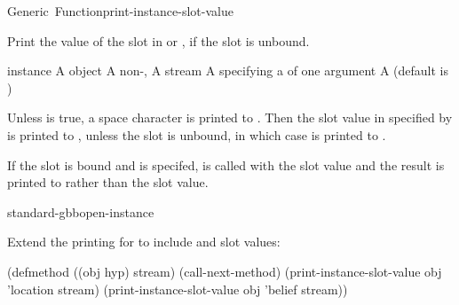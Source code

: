 \documentclass[10pt,twoside,english,pdftex]{article}
\begin{document}
\begin{functiondoc}{Generic~Function}{print-instance-slot-value}%
  {
    }

\fnsyntax

\fnpurpose Print the value of the  slot in 
or \code{[Unbound]}, if the slot is unbound.

\fnmethods
{}

\fnpackage {}

\fnmodule {}

\fnargs
\begin{args}{instance}
\arg[instance] A  object
 A non-\nil, 
\arg[stream] A stream
\arg[function] A  specifying a 
   of one argument
\arg[no-space] A  (default is \nil)
\end{args}

\fndescription
%
Unless  is true, a space character is printed to .
Then the slot value in  specified by  is
printed to , unless the slot is unbound, in which case
\code{[Unbound]} is printed to .

If the slot is bound and  is specifed,  is
called with the slot value and the result is printed to  rather
than the slot value.

\begin{alsos}{standard-gbbopen-instance}
\end{alsos}

\fnexample
%
%
Extend the  printing for 
 to include  and  slot values:
\W\supp
\begin{example}
  (defmethod  ((obj hyp) stream)
    (call-next-method)
    (print-instance-slot-value obj 'location stream)
    (print-instance-slot-value obj 'belief stream))
\end{example}

\end{functiondoc}
\end{document}
